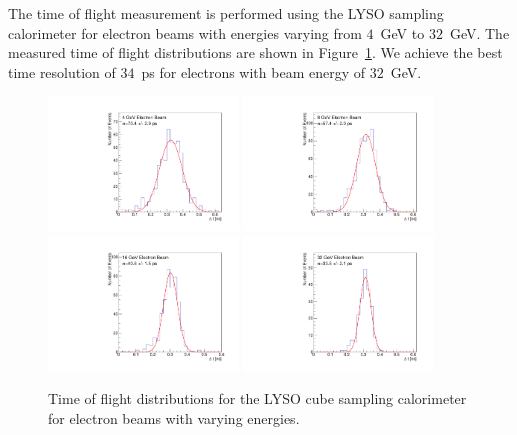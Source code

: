 \documentclass[12pt]{article}
\begin{document}
{The time of flight measurement is performed using the LYSO sampling calorimeter
for electron beams with energies varying from $4$~GeV to $32$~GeV. The 
measured time of flight distributions are shown in Figure~\ref{fig:LYSOCubeTOF}.
We achieve the best time resolution of $34$~ps for electrons
with beam energy of $32$~GeV.

\begin{figure}[H] \centering
\includegraphics[width=0.45\textwidth]{figs/TOF_Electron_LYSOCube_4GeV} 
\includegraphics[width=0.45\textwidth]{figs/TOF_Electron_LYSOCube_8GeV} 
\includegraphics[width=0.45\textwidth]{figs/TOF_Electron_LYSOCube_16GeV} 
\includegraphics[width=0.45\textwidth]{figs/TOF_Electron_LYSOCube_32GeV} 
\caption{ Time of flight distributions for the LYSO cube sampling calorimeter
for electron beams with varying energies. } 
\label{fig:LYSOCubeTOF}
\end{figure}

}
\end{document}
